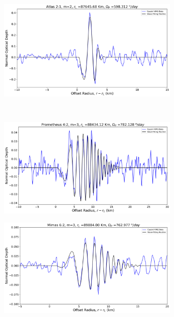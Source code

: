 \documentclass{article}
\begin{document}
\begin{figure}[h]
    \begin{subfigure}{0.35\linewidth}
        \includegraphics[width=\linewidth]{atlas_21_wavefit.png}
        \label{fig:atlas21}
    \end{subfigure}
    \\ %

    \begin{subfigure}{0.35\linewidth}
        \includegraphics[width=\linewidth]{prometheus_42_wavefit.png}
        \label{fig:prometheus42}
    \end{subfigure}
    \hspace{1\linewidth}

    \begin{subfigure}{0.35\linewidth}
        \includegraphics[width=\linewidth]{mimas_62_wavefit.png}
        \label{fig:mimas62}
    \end{subfigure}
    \hspace{1\linewidth}


\end{figure}
\end{document}
